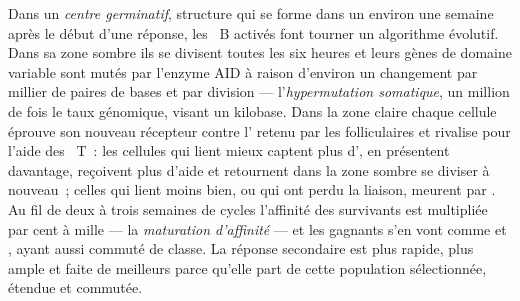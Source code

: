 \begin{definition}\label{def:b3:adaptive-immunity:germinal-centre}
Dans un \emph{centre germinatif}, structure qui se forme dans un
 environ une semaine après le début d'une réponse,
les ~B activés font tourner un algorithme évolutif. Dans sa
zone sombre ils se divisent toutes les six heures et leurs gènes de
domaine variable sont mutés par l'enzyme AID à raison d'environ un
changement par millier de paires de bases et par division ---
l'\emph{hypermutation somatique}, un million de fois le taux génomique,
visant un kilobase. Dans la zone claire chaque cellule éprouve son
nouveau récepteur contre l' retenu par les 
folliculaires et rivalise pour l'aide des ~T~: les cellules
qui lient mieux captent plus d', en présentent davantage,
reçoivent plus d'aide et retournent dans la zone sombre se diviser à
nouveau~; celles qui lient moins bien, ou qui ont perdu la liaison,
meurent par . Au fil de deux à trois semaines de cycles
l'affinité des  survivants est multipliée par cent à mille ---
la \emph{maturation d'affinité} --- et les gagnants s'en vont comme
 et , ayant aussi commuté de classe. La
réponse secondaire est plus rapide, plus ample et faite de meilleurs
 parce qu'elle part de cette population sélectionnée, étendue
et commutée.
\end{definition}


